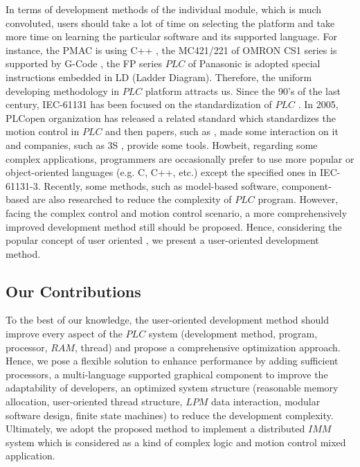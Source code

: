 \documentclass[journal,UTF8]{IEEEtran}
\begin{document}
In terms of development methods of the individual module, which is much convoluted, users should take a lot of time on selecting the platform and take more time on learning the particular software and its supported language. For instance, the PMAC is using C++ \cite{Peng2011Linear,Qian2014A}, the MC421/221 of OMRON CS1 series is supported by G-Code \cite{OMRON2006CS1W}, the FP series $PLC$ of Panasonic is adopted special instructions embedded in LD (Ladder Diagram). Therefore, the uniform developing methodology in $PLC$ platform attracts us. Since the 90's of the last century, IEC-61131 has been focused on the standardization of $PLC$ \cite{IEC1993Programmable}. In 2005, PLCopen organization has released a related standard \cite{PLCopen2005Function} which standardizes the motion control in $PLC$ and then papers, such as \cite{S2006Advanced}, made some interaction on it and companies, such as 3S \cite{3S2017Logic}, provide some tools. Howbeit, regarding some complex applications, programmers are occasionally prefer to use more popular or object-oriented languages (e.g. C, C++, etc.) \cite{Bonfe2001Object, Werner2009Object, Basile2013On} except the specified ones in IEC-61131-3. Recently, some methods, such as model-based software, component-based \cite{Bonf2013Design, Vyatkin2013Software} are also researched to reduce the complexity of $PLC$ program. However, facing the complex control and motion control scenario, a more comprehensively improved development method still should be proposed. Hence, considering the popular concept of user oriented \cite{Verscheure2016User, Choi2017A}, we present a user-oriented development method.

\subsection{Our Contributions}
To the best of our knowledge, the user-oriented development method should improve every aspect of the $PLC$ system (development method, program, processor, $RAM$, thread) and propose a comprehensive optimization approach. Hence, we pose a flexible solution to enhance performance by adding sufficient processors, a multi-language supported graphical component to improve the adaptability of developers, an optimized system structure (reasonable memory allocation, user-oriented thread structure, $LPM$ data interaction, modular software design, finite state machines) to reduce the development complexity. Ultimately, we adopt the proposed method to implement a distributed $IMM$ system which is considered as a kind of complex logic and motion control mixed application.
\end{document}
